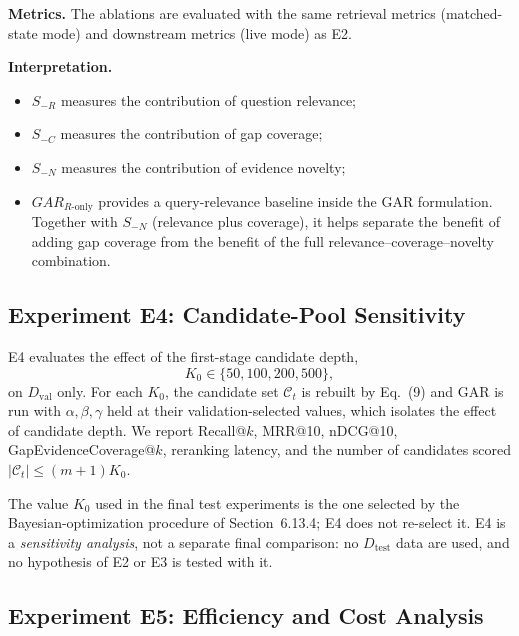 \documentclass[11pt,a4paper]{article}
\begin{document}
\textbf{Metrics.} The ablations are evaluated with the same retrieval metrics (matched-state mode) and downstream metrics (live mode) as E2.

\textbf{Interpretation.}
\begin{itemize}[leftmargin=1.5em]
\item $S_{-R}$ measures the contribution of question relevance;
\item $S_{-C}$ measures the contribution of gap coverage;
\item $S_{-N}$ measures the contribution of evidence novelty;
\item $GAR_{R\text{-only}}$ provides a query-relevance baseline inside the GAR formulation. Together with $S_{-N}$ (relevance plus coverage), it helps separate the benefit of adding gap coverage from the benefit of the full relevance--coverage--novelty combination.
\end{itemize}

\subsection{Experiment E4: Candidate-Pool Sensitivity}
\label{sec:e4}

E4 evaluates the effect of the first-stage candidate depth,
\[
K_0\in\{50,100,200,500\},
\]
on $D_{\mathrm{val}}$ only. For each $K_0$, the candidate set $\mathcal{C}_t$ is rebuilt by Eq.~(9) and GAR is run with $\alpha,\beta,\gamma$ held at their validation-selected values, which isolates the effect of candidate depth. We report Recall@$k$, MRR@10, nDCG@10, GapEvidenceCoverage@$k$, reranking latency, and the number of candidates scored $|\mathcal{C}_t|\le(m+1)K_0$.

The value $K_0$ used in the final test experiments is the one selected by the Bayesian-optimization procedure of Section~6.13.4; E4 does not re-select it. E4 is a \emph{sensitivity analysis}, not a separate final comparison: no $D_{\mathrm{test}}$ data are used, and no hypothesis of E2 or E3 is tested with it.

\subsection{Experiment E5: Efficiency and Cost Analysis}
\label{sec:e5}
\end{document}
